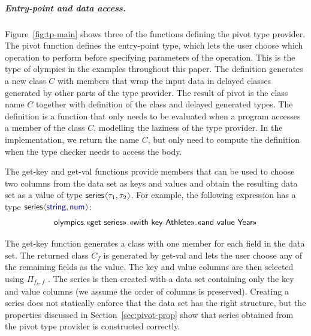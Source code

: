 \documentclass[a4paper,UKenglish]{lipics-v2016}
\theoremstyle{plain}
\theoremstyle{definition}
\newcommand{\langl}{\begin{picture}(4.5,7)
\put(1.1,2.5){\rotatebox{60}{\line(1,0){5.5}}}
\put(1.1,2.5){\rotatebox{300}{\line(1,0){5.5}}}
\end{picture}}
\newcommand{\rangl}{\begin{picture}(4.5,7)
\put(.9,2.5){\rotatebox{120}{\line(1,0){5.5}}}
\put(.9,2.5){\rotatebox{240}{\line(1,0){5.5}}}
\end{picture}}
\newcommand{\ball}[1]{\FPeval{\result}{clip(201+#1)}\textnormal{\ding{\result}}}
\newcommand{\kvd}[1]{\textnormal{\textcolor{kvdclr}{\sffamily #1}}}
\newcommand{\ident}[1]{\textnormal{\sffamily #1}}
\newcommand{\qident}[1]{\textnormal{\sffamily \guillemotleft #1\guillemotright}}
\begin{document}
\subparagraph{Entry-point and data access.} Figure~\ref{fig:tp-main} shows three of the functions
defining the pivot type provider. The \ident{pivot} function \ball{1} defines the entry-point type, 
which lets the user choose which operation to perform before specifying parameters of the operation. 
This is the type of \ident{olympics} in the examples throughout this paper. The definition generates 
a new class $C$ with members that wrap the input data in delayed classes generated by other parts
of the type provider. The result of \ident{pivot} is the class name $C$ together with definition of 
the class and delayed generated types. The definition is a function that only needs to be evaluated 
when a program accesses a member of the class $C$, modelling the laziness of the type provider.
In the implementation, we return the name $C$, but only need to compute the definition when the 
type checker needs to access the body.

The \ident{get-key} \ball{2} and \ident{get-val} \ball{3} functions provide members that can be used 
to choose two columns from the data set as keys and values and obtain the resulting data set as a 
value of type $\ident{series}\langl \tau_1, \tau_2 \rangl$. For example, the following expression 
has a type $\ident{series}\langl \kvd{string}, \kvd{num} \rangl$:
%
\begin{equation*}
\begin{array}{l}
\ident{olympics}.\qident{get series}.\qident{with key Athlete}.\qident{and value Year}
\end{array}
\end{equation*}

\noindent
The \ident{get-key} function generates a class with one member for each field in the data set.
The returned class $C_f$ is generated by \ident{get-val} and lets the user choose any of the 
remaining fields as the value. The key and value columns are then selected using $\Pi_{f_k,f}$ \ball{4}.
The series is then created with a data set containing only the key and value columns (we assume 
the order of columns is preserved). Creating a series does not statically enforce that the 
data set has the right structure, but the properties discussed in Section~\ref{sec:pivot-prop} show 
that series obtained from the pivot type provider is constructed correctly.

\end{document}
